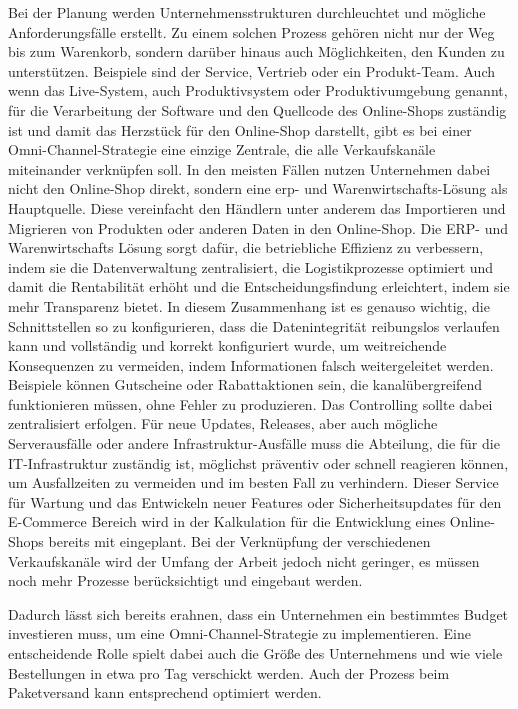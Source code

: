 Bei der Planung werden Unternehmensstrukturen durchleuchtet und mögliche Anforderungsfälle erstellt. Zu einem solchen Prozess gehören nicht nur der Weg bis zum Warenkorb, sondern darüber hinaus auch Möglichkeiten, den Kunden zu unterstützen. Beispiele sind der Service, Vertrieb oder ein Produkt-Team.
\newline
Auch wenn das Live-System, auch Produktivsystem oder Produktivumgebung genannt, für die Verarbeitung der Software und den Quellcode des Online-Shops zuständig ist und damit das Herzstück für den Online-Shop darstellt, gibt es bei einer Omni-Channel-Strategie eine einzige Zentrale, die alle Verkaufskanäle miteinander verknüpfen soll. In den meisten Fällen nutzen Unternehmen dabei nicht den Online-Shop direkt, sondern eine \ac{erp}- und Warenwirtschafts-Lösung als Hauptquelle. Diese vereinfacht den Händlern unter anderem das Importieren und Migrieren von Produkten oder anderen Daten in den Online-Shop.
\newline
Die ERP- und Warenwirtschafts Lösung sorgt dafür, die betriebliche Effizienz zu verbessern, indem sie die Datenverwaltung zentralisiert, die Logistikprozesse optimiert und damit die Rentabilität erhöht und die Entscheidungsfindung erleichtert, indem sie mehr Transparenz bietet. In diesem Zusammenhang ist es genauso wichtig, die Schnittstellen so zu konfigurieren, dass die Datenintegrität reibungslos verlaufen kann und vollständig und korrekt konfiguriert wurde, um weitreichende Konsequenzen zu vermeiden, indem Informationen falsch weitergeleitet werden. Beispiele können Gutscheine oder Rabattaktionen sein, die kanalübergreifend funktionieren müssen, ohne Fehler zu produzieren. Das Controlling sollte dabei zentralisiert erfolgen.
\newline
Für neue Updates, Releases, aber auch mögliche Serverausfälle oder andere Infrastruktur-Ausfälle muss die Abteilung, die für die IT-Infrastruktur zuständig ist, möglichst präventiv oder schnell reagieren können, um Ausfallzeiten zu vermeiden und im besten Fall zu verhindern. Dieser Service für Wartung und das Entwickeln neuer Features oder Sicherheitsupdates für den E-Commerce Bereich wird in der Kalkulation für die Entwicklung eines Online-Shops bereits mit eingeplant. Bei der Verknüpfung der verschiedenen Verkaufskanäle wird der Umfang der Arbeit jedoch nicht geringer, es müssen noch mehr Prozesse berücksichtigt und eingebaut werden.
\newline

Dadurch lässt sich bereits erahnen, dass ein Unternehmen ein bestimmtes Budget investieren muss, um eine Omni-Channel-Strategie zu implementieren. Eine entscheidende Rolle spielt dabei auch die Größe des Unternehmens und wie viele Bestellungen in etwa pro Tag verschickt werden. Auch der Prozess beim Paketversand kann entsprechend optimiert werden.
\newline

